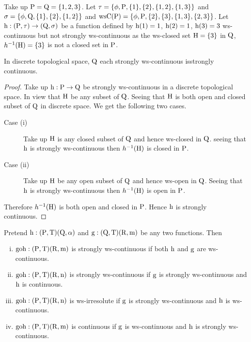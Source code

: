 \begin{exm}\label{exam3.3.6}
Take up $\mathrm{P}=\mathrm{Q}= \{1, 2, 3\}$. Let $\tau = \{\phi, \mathrm{P}, \{1\}, \{2\}, \{1, 2\}, \{1, 3\}\}$ and $\sigma = \{\phi, \mathrm{Q}, \{1\}, \{2\}, \{1,2\}\}$ and $\mathrm{ws}\mathrm{C}(\mathrm{P})= \{\phi, \mathrm{P}, \{2\}, \{3\}, \{1, 3\},\{2,3\}\}$. Let $\mathrm{h}: (\mathrm{P},\tau)\to (\mathrm{Q}, \sigma)$ be a function defined by $\mathrm{h}(1)=1$, $\mathrm{h}(2)=1$, $\mathrm{h}(3)=3$ ws-continuous but not strongly ws-continuous as the ws-closed set $\mathrm{H}= \{3\}$ in $\mathrm{Q}$, $h^{-1}(\mathrm{H})=\{3\}$ is not a closed set in $\mathrm{P}$.
\end{exm}

\begin{thm}\label{thm3.3.11}
In discrete topological space, $\mathrm{Q}$ each strongly ws-continuous is\break strongly continuous.
\end{thm}

\begin{proof}
Take up $\mathrm{h}: \mathrm{P}\to \mathrm{Q}$ be strongly ws-continuous in a discrete topological space. In view that $\mathrm{H}$ be any subset of $\mathrm{Q}$. Seeing that $\mathrm{H}$ is both open and closed subset of $\mathrm{Q}$ in discrete space. We get the following two cases.
\begin{description}
\item[Case (i)] Take up $\mathrm{H}$ is any closed subset of $\mathrm{Q}$ and hence ws-closed in $\mathrm{Q}$. seeing that $\mathrm{h}$ is strongly ws-continuous then $h^{-1}(\mathrm{H})$ is closed in $\mathrm{P}$.
\item[Case (ii)] Take up $\mathrm{H}$ be any open subset of $\mathrm{Q}$ and hence ws-open in $\mathrm{Q}$. Seeing that $\mathrm{h}$ is strongly ws-continuous then $h^{-1}(\mathrm{H})$ is open in $\mathrm{P}$.
\end{description}
Therefore $h^{-1}(\mathrm{H})$ is both open and closed in $\mathrm{P}$. Hence $\mathrm{h}$ is strongly continuous.
\end{proof}

\begin{thm}\label{thm3.3.12}
Pretend $\mathrm{h}: (\mathrm{P},\mathrm{T})(\mathrm{Q},\alpha)$ and $\mathrm{g}: (\mathrm{Q},\mathrm{T})(\mathrm{R},\mathrm{m})$ be any two functions. Then
\begin{enumerate}[(i)]
\item $\text{goh}: (\mathrm{P},\mathrm{T})(\mathrm{R},\mathrm{m})$ is strongly ws-continuous if both $\mathrm{h}$ and $\mathrm{g}$ are ws-continuous.
\item $\text{goh}: (\mathrm{P},\mathrm{T})(\mathrm{R},\mathrm{n})$ is strongly ws-continuous if $\mathrm{g}$ is strongly ws-continuous and $\mathrm{h}$ is continuous.
\item $\text{goh}: (\mathrm{P},\mathrm{T})(\mathrm{R},\mathrm{n})$ is ws-irresolute if $\mathrm{g}$ is strongly ws-continuous and $\mathrm{h}$ is ws-continuous.
\item $\text{goh}: (\mathrm{P},\mathrm{T})(\mathrm{R},\mathrm{m})$ is continuous if $\mathrm{g}$ is ws-continuous and $\mathrm{h}$ is strongly ws-continuous.
\end{enumerate}
\end{thm}


